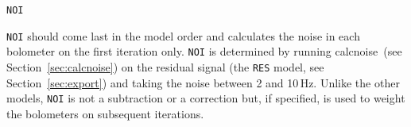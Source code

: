 \documentclass[twoside,11pt]{article}
\newcommand{\htmlref}[2]{#1}
\newcommand{\latexhtml}[2]{#1}
\newcommand{\xref}[3]{#1}
\renewcommand{\_}{\texttt{\symbol{95}}}
\newcommand{\task}[1]{\textsf{#1}}
\newcommand{\calcnoise}{\xref{\task{calcnoise}}{sun258}{CALCNOISE}}
\newcommand{\cref}[3]{\latexhtml{#1~\ref{#2}}{\htmlref{#3}{#2}}}
\begin{document}
\begin{minipage}[t]{0.07\linewidth}
\texttt{NOI}
\end{minipage}
\begin{minipage}[t]{0.92\linewidth}\texttt{NOI} should come last in the model
order and calculates the noise in each bolometer on the first iteration only. \texttt{NOI} is
determined by running \calcnoise\ (see \cref{Section}{sec:calcnoise}{Checking the
array performance}) on the residual signal (the \texttt{RES} model, see
\cref{Section}{sec:export}{Exporting individual models}) and taking the noise
between 2 and 10\,Hz. Unlike the other models, \texttt{NOI} is not a subtraction or
a correction but, if specified, is used to weight the bolometers on subsequent iterations.
\end{minipage}

\end{document}
